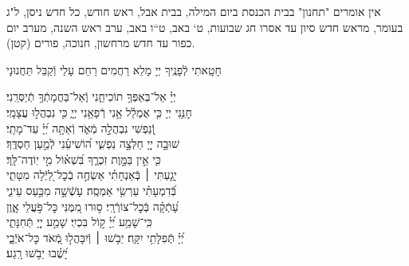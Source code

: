 \documentclass[twoside, openany, parskip=half, 11pt]{book}
\begin{document}
\newcommand{\nefilasapayim}{
\firstword{רַחוּם וְֿחַנּוּן,}
חָטָֽאתִי לְֿפָנֶֽיךָ יְיָ מָלֵא רַחֲמִים רַחֵם עָלַי וְֿקַבֵּל תַּחֲנוּנָי
\begin{narrow}
יְיָ֗ אַל־בְּאַפְּךָ֥ תוֹכִיחֵ֑נִי \hfill וְֽֿאַל־בַּחֲמָתְֿךָ֥ תְֿיַסְּרֵֽנִי׃ \\
חׇנֵּ֥נִי יְיָ כִּ֤י אֻמְלַ֫ל אָ֥נִי \hfill רְֿפָאֵ֥נִי יְיָ֑ כִּ֖י נִבְהֲל֣וּ עֲצָמָֽי׃ \\
וְֿ֭נַפְשִׁי נִבְהֲלָ֣ה מְֿאֹ֑ד \hfill וְֿאַתָּ֥ה יְ֝יָ֗ עַד־מָתָֽי׃ \\
שׁוּבָ֣ה יְיָ֭ חַלְּצָ֣ה נַפְשִׁ֑י \hfill ה֝וֹשִׁיעֵ֗נִי לְֿמַ֣עַן חַסְדֶּֽךָ׃ \\
כִּ֤י אֵ֣ין בַּמָּ֣וֶת זִכְרֶ֑ךָ \hfill בִּ֝שְׁא֗וֹל מִ֣י יֽוֹדֶה־לָּֽךְ׃ \\
יָגַ֤עְתִּי ׀ בְּֽֿאַנְחָתִ֗י \hfill אַשְׂחֶ֣ה בְֿכׇל־לַ֭יְֿלָה מִטָּתִ֑י\\ בְּֿ֝דִמְעָתִ֗י עַרְשִׂ֥י אַמְסֶֽה׃ \hfill
עָשְֿׁשָׁ֣ה מִכַּ֣עַס עֵינִ֑י \\ עָ֝תְֿקָ֗ה בְּֿכׇל־צוֹרְֿרָֽי׃ \hfill
ס֣וּרוּ מִ֭מֶּנִּי כׇּל־פֹּ֣עֲלֵי אָ֑וֶן \\ כִּֽי־שָׁמַ֥ע יְ֝יָ֗ ק֣וֹל בִּכְיִֽי׃ \hfill
שָׁמַ֣ע יְיָ֭ תְּֿחִנָּתִ֑י \\ יְ֝יָ֗ תְּֽֿפִלָּתִ֥י יִקָּֽח׃ \hfill
יֵבֹ֤שׁוּ ׀ וְֿיִבָּהֲל֣וּ מְֿ֭אֹד כׇּל־אֹיְֿבָ֑י \\ יָ֝שֻׁ֗בוּ יֵבֹ֥שׁוּ רָֽגַע׃ \hfill \break
\end{narrow}\negline
}



\begin{scriptsize}

\textsf{
אין אומרים "תחנון" בבית הכנסת ביום המילה, בבית אבל, ראש חודש, כל חדש ניסן, ל"ג בעומר, מראש חדש סיון עד אסרו חג שבועות, ט` באב, ט``ו באב, ערב ראש השנה, מערב יום כפור עד חדש מרחשון, חנוכה, פורים (קטן).
}

\end{scriptsize}
\nefilasapayim \label{nefilas_apayim}

\negline
\end{document}
